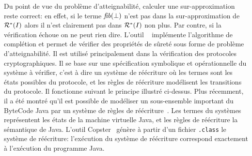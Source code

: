 Du point de vue du problème d'atteignabilité, calculer une sur-approximation reste correct: en effet, si le terme $\mathit{fib}(\perp)$ 
n'est pas dans la sur-approximation de $\mathcal R^*(I)$ alors il n'est clairement pas dans $\mathcal R^*(I)$
non plus. Par contre, si la vérification échoue on ne peut rien dire.
L'outil \timbuk~\cite{timbuk} implémente l'algorithme de complétion et permet de vérifier des propriétés
de sûreté sous forme de problème d'atteignabilité. Il est utilisé principalement dans la
vérification des protocoles cryptographiques. Il se base sur une spécification symbolique 
et opérationnelle du système à vérifier, c'est à dire un système de réécriture où les termes sont les états possibles
du protocole, et les règles de réécriture modélisent les transitions du protocole.
Il fonctionne suivant le principe illustré ci-dessus.
Plus récemment, il a été montré qu'il est possible de modéliser un sous-ensemble important du ByteCode Java
par un système de règles de réécriture~\cite{BoichutGJL-RTA07}. Les termes du systèmes représentent les états
de la machine virtuelle Java, et les règles de réécriture la sémantique de Java. L'outil Copster~\cite{Copster} 
génère à partir d'un fichier \texttt{.class} le système de réécriture: l'exécution du système de réécriture 
correspond exactement à l'exécution du programme Java. 



